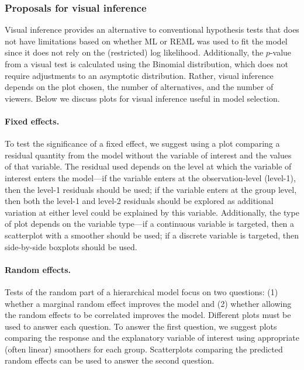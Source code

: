 \documentclass{article} %
\begin{document}
\subsubsection{Proposals for visual inference}

Visual inference provides an alternative to conventional hypothesis tests that does not have limitations based on whether ML or REML was used to fit the model since it does not rely on the (restricted) log likelihood. Additionally, the $p$-value from a visual test is calculated using the Binomial distribution, which does not require adjustments to an asymptotic distribution. Rather, visual inference depends on the plot chosen, the number of alternatives, and the number of viewers. Below we discuss plots for visual inference useful in model selection.

\paragraph{Fixed effects.} To test the significance of a fixed effect, we suggest using a plot comparing a residual quantity from the model without the variable of interest and the values of that variable. The residual used depends on the level at which the variable of interest enters the model---if the variable enters at the observation-level (level-1), then the level-1 residuals should be used; if the variable enters at the group level, then both the level-1 and level-2 residuals should be explored as additional variation at either level could be explained by this variable. Additionally, the type of plot depends on the variable type---if a continuous variable is targeted, then a scatterplot with a smoother should be used; if a discrete variable is targeted, then side-by-side boxplots should be used.



\paragraph{Random effects.} Tests of the random part of a hierarchical model focus on two questions: (1) whether a marginal random effect improves the model and (2) whether allowing the random effects to be correlated improves the model. Different plots must be used to answer each question. To answer the first question, we suggest plots comparing the response and the explanatory variable of interest using appropriate (often linear) smoothers for each group. Scatterplots comparing the predicted random effects can be used to answer the second question.
\end{document}
